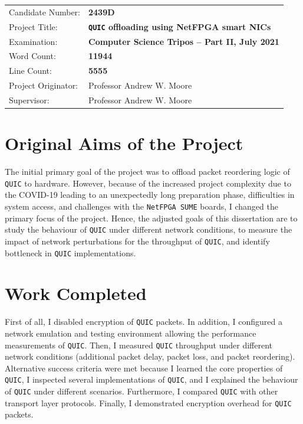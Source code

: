 \documentclass[12pt,a4paper]{report}
\begin{document}
{\large
\begin{tabular}{ll}
Candidate Number:               & \bf 2439D                      \\
Project Title:      & \bf \texttt{QUIC} offloading using NetFPGA smart NICs \\
Examination:        & \bf Computer Science Tripos -- Part II, July 2021  \\
Word Count:         & \bf 11944\footnotemark[1] \\
Line Count:         & \bf 5555\footnotemark[2] \\
Project Originator: & Professor Andrew W. Moore                \\
Supervisor:         & Professor Andrew W. Moore                \\ 
\end{tabular}
}





\section*{Original Aims of the Project}

The initial primary goal of the project was to offload packet reordering logic of \texttt{QUIC} to hardware.
However, because of the increased project complexity due to the COVID-19 leading to an unexpectedly long preparation phase, difficulties in system access, and challenges with the \texttt{NetFPGA SUME} boards, I changed the primary focus of the project.
Hence, the adjusted goals of this dissertation are to study the behaviour of \texttt{QUIC} under different network conditions, to measure the impact of network perturbations for the throughput of \texttt{QUIC}, and identify bottleneck in \texttt{QUIC} implementations.

\section*{Work Completed}

First of all, I disabled encryption of \texttt{QUIC} packets.
In addition, I configured a network emulation and testing environment allowing the performance measurements of \texttt{QUIC}.
Then, I measured \texttt{QUIC} throughput under different network conditions (additional packet delay, packet loss, and packet reordering).
Alternative success criteria were met because I learned the core properties of \texttt{QUIC}, I inspected several implementations of \texttt{QUIC}, and I explained the behaviour of \texttt{QUIC} under different scenarios.
Furthermore, I compared \texttt{QUIC} with other transport layer protocols.
Finally, I demonstrated encryption overhead for \texttt{QUIC} packets.
\end{document}
